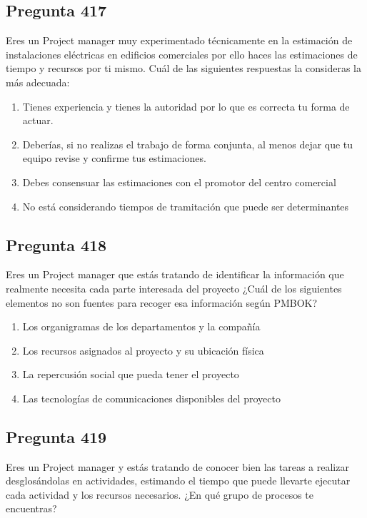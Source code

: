 \documentclass[11pt,a4paper]{article}
\begin{document}
\subsection*{Pregunta 417}
Eres un Project manager muy experimentado técnicamente en la estimación de instalaciones eléctricas en edificios comerciales por ello haces las estimaciones de tiempo y recursos por ti mismo. Cuál de las siguientes respuestas la consideras la más adecuada:

\begin{enumerate}[label=\alph*)]
  \item Tienes experiencia y tienes la autoridad por lo que es correcta tu forma de actuar.
  \item Deberías, si no realizas el trabajo de forma conjunta, al menos dejar que tu equipo revise y confirme tus estimaciones.
  \item Debes consensuar las estimaciones con el promotor del centro comercial
  \item No está considerando tiempos de tramitación que puede ser determinantes
\end{enumerate}

\subsection*{Pregunta 418}
Eres un Project manager que estás tratando de identificar la información que realmente necesita cada parte interesada del proyecto ¿Cuál de los siguientes elementos no son fuentes para recoger esa información según PMBOK?

\begin{enumerate}[label=\alph*)]
  \item Los organigramas de los departamentos y la compañía
  \item Los recursos asignados al proyecto y su ubicación física
  \item La repercusión social que pueda tener el proyecto
  \item Las tecnologías de comunicaciones disponibles del proyecto
\end{enumerate}

\subsection*{Pregunta 419}
Eres un Project manager y estás tratando de conocer bien las tareas a realizar desglosándolas en actividades, estimando el tiempo que puede llevarte ejecutar cada actividad y los recursos necesarios. ¿En qué grupo de procesos te encuentras?
\end{document}
